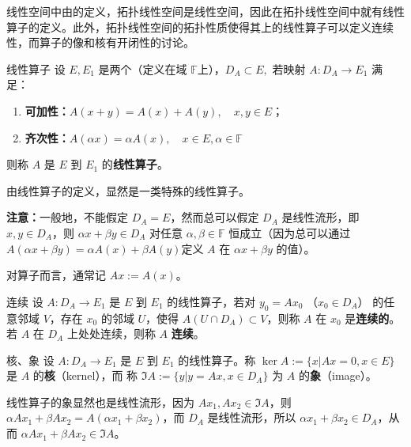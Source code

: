 
线性空间中由的定义，拓扑线性空间是线性空间，因此在拓扑线性空间中就有线性算子的定义。此外，拓扑线性空间的拓扑性质使得其上的线性算子可以定义连续性，而算子的像和核有开闭性的讨论。

\begin{definition}{线性算子}
设 $E,E_1$ 是两个（定义在域 $\mathbb F$上），$D_A\subset E,$ 若映射 $A:D_A\rightarrow E_1$ 满足：
\begin{enumerate}
\item \textbf{可加性：}$A(x+y)=A(x)+A(y),\quad x,y\in E$；
\item \textbf{齐次性：}$A(\alpha x)=\alpha A(x),\quad x\in E,\alpha\in \mathbb F$
\end{enumerate}
则称 $A$ 是 $E$ 到 $E_1$ 的\textbf{线性算子}。
  
\end{definition}

由线性算子的定义，显然是一类特殊的线性算子。

\textbf{注意：}一般地，不能假定 $D_A=E$，然而总可以假定 $D_A$ 是线性流形，即 $x,y\in D_A$，则 $\alpha x+\beta y\in D_A$ 对任意 $\alpha,\beta\in\mathbb F$ 恒成立（因为总可以通过 $A(\alpha x+\beta y)=\alpha A(x)+\beta A(y)$定义 $A$ 在 $\alpha x+\beta y$ 的值）。

对算子而言，通常记 $Ax:=A(x)$。

\begin{definition}{连续}
设 $A:D_A\rightarrow E_1$ 是 $E$ 到 $E_1$ 的线性算子，若对 $y_0=Ax_0$ （$x_0\in D_A$） 的任意邻域 $V$，存在 $x_0$ 的邻域 $U$，使得 $A(U\cap D_A)\subset V$，则称 $A$ 在 $x_0$ 是\textbf{连续的}。若 $A$ 在 $D_A$ 上处处连续，则称 $A$ \textbf{连续}。
\end{definition}


\begin{definition}{核、象}
设 $A:D_A\rightarrow E_1$ 是 $E$ 到 $E_1$ 的线性算子。称 $\ker A:=\{x|Ax=0,x\in E\}$ 是 $A$ 的\textbf{核}（kernel），而 称 $\Im A:=\{y|y=Ax,x\in D_A\}$ 为 $A$ 的\textbf{象}（image）。 
\end{definition}

线性算子的象显然也是线性流形，因为 $Ax_1,Ax_2\in \Im A$，则 $\alpha Ax_1+\beta Ax_2=A(\alpha x_1+\beta x_2)$，而 $D_A$ 是线性流形，所以 $\alpha x_1+\beta x_2\in D_A$，从而 $\alpha Ax_1+\beta Ax_2\in\Im A$。 


